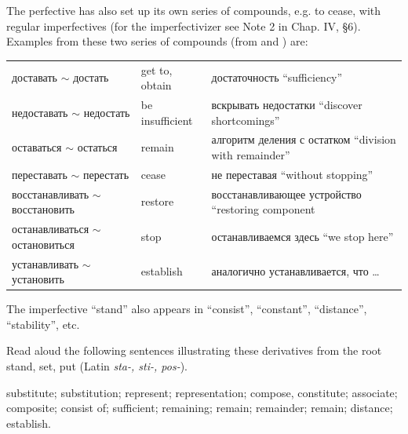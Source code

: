 The perfective  has also set up its own series of compounds, e.g.  to cease, with regular imperfectives  (for the imperfectivizer  see Note 2 in Chap. IV, §6). Examples from these two series of compounds (from  and ) are:

\begin{center}
\small
\begin{tabular}{@{}>{\cyrillicfont}p{43mm}p{30mm}>{\cyrillicfont}p{67mm}@{}}
доставать $\sim$ достать & get to, obtain & достаточность ``sufficiency''\\
недоставать $\sim$ недостать & be insufficient & вскрывать недостатки ``discover shortcomings''\\
оставаться $\sim$ остаться & remain & алгоритм деления с остатком ``division with remainder''\\
переставать $\sim$ перестать & cease & не переставая ``without stopping''\\
восстанавливать $\sim$ восстановить & restore & восстанавливающее устройство ``restoring component\\
останавливаться $\sim$ остановиться & stop & останавливаемся здесь ``we stop here''\\
устанавливать $\sim$ установить & establish & аналогично устанавливается, что \ldots\\
\end{tabular}
\end{center}

The imperfective  ``stand'' also appears in  ``consist'',  ``constant'',  ``distance'',  ``stability'', etc.

\begin{keybox}[Exercise 5.6]
Read aloud the following sentences illustrating these derivatives from the root  stand, set, put (Latin \emph{sta-, sti-, pos-}).
\end{keybox}

\noindent{} substitute;  substitution;  represent;  representation;  compose, constitute;  associate;  composite;  consist of;  sufficient;  remaining;  remain;  remainder;  remain;  distance;  establish.

